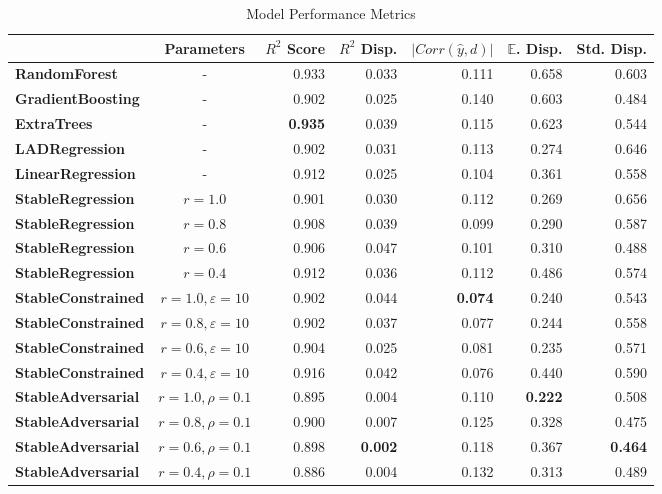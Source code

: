 \documentclass{article}
\begin{document}
\begin{table}[!h]
\caption{Model Performance Metrics}
\label{tab:performance}
\begin{tabular}{|l|c|r|r|r|r|r|}
\toprule
 &Parameters & \textbf{$R^2$ Score} & \textbf{$R^2$ Disp.} & \textbf{$|Corr(\hat{y}, d)|$} & \textbf{$\mathbb{E}$. Disp.} & \textbf{Std. Disp.} \\
\midrule
\textbf{RandomForest}     & - & 0.933 & 0.033 & 0.111 & 0.658 & 0.603 \\
\textbf{GradientBoosting} & - & 0.902 & 0.025 & 0.140 & 0.603 & 0.484 \\
\textbf{ExtraTrees}       & - & \textbf{0.935} & 0.039 & 0.115 & 0.623 & 0.544 \\
\textbf{LADRegression}    & - & 0.902 & 0.031 & 0.113 & 0.274 & 0.646 \\
\textbf{LinearRegression} & - & 0.912 & 0.025 & 0.104 & 0.361 & 0.558 \\
\textbf{StableRegression} & $r=1.0$ & 0.901 & 0.030 & 0.112 & 0.269 & 0.656 \\
\textbf{StableRegression} & $r=0.8$ & 0.908 & 0.039 & 0.099 & 0.290 & 0.587 \\
\textbf{StableRegression} & $r=0.6$ & 0.906 & 0.047 & 0.101 & 0.310 & 0.488 \\
\textbf{StableRegression} & $r=0.4$ & 0.912 & 0.036 & 0.112 & 0.486 & 0.574 \\
\midrule
\textbf{StableConstrained} &$r=1.0,\varepsilon=10$ & 0.902 & 0.044 & \textbf{0.074} & 0.240 & 0.543 \\
\textbf{StableConstrained} &$r=0.8,\varepsilon=10$ & 0.902 & 0.037 & 0.077 & 0.244 & 0.558 \\
\textbf{StableConstrained} &$r=0.6,\varepsilon=10$ & 0.904 & 0.025 & 0.081 & 0.235 & 0.571 \\
\textbf{StableConstrained} &$r=0.4,\varepsilon=10$ & 0.916 & 0.042 & 0.076 & 0.440 & 0.590 \\
\textbf{StableAdversarial} &$r=1.0,\rho=0.1$ & 0.895 & 0.004 & 0.110 & \textbf{0.222} & 0.508 \\
\textbf{StableAdversarial} &$r=0.8,\rho=0.1$ & 0.900 & 0.007 & 0.125 & 0.328 & 0.475 \\
\textbf{StableAdversarial} &$r=0.6,\rho=0.1$ & 0.898 & \textbf{0.002} & 0.118 & 0.367 & \textbf{0.464} \\
\textbf{StableAdversarial} &$r=0.4,\rho=0.1$ & 0.886 & 0.004 & 0.132 & 0.313 & 0.489 \\
\bottomrule
\end{tabular}
\end{table}
\end{document}
